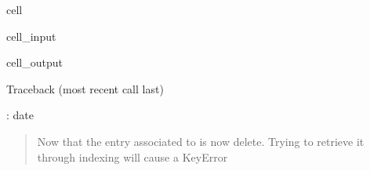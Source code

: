 \documentclass[letterpaper,10pt,english]{jupyterBook}
\begin{document}
\begin{sphinxuseclass}{cell}\begin{sphinxVerbatimInput}

\begin{sphinxuseclass}{cell_input}
\begin{sphinxVerbatim}[commandchars=\\\{\}]
\PYG{p}{[}\PYG{p}{]}
\end{sphinxVerbatim}

\end{sphinxuseclass}\end{sphinxVerbatimInput}
\begin{sphinxVerbatimOutput}

\begin{sphinxuseclass}{cell_output}
\begin{sphinxVerbatim}[commandchars=\\\{\}]
Traceback (most recent call last)
 \PYG{p}{[}\PYG{p}{]}  
 \PYG{p}{[}\PYG{p}{]}

: \PYGZsq{}date\PYGZsq{}
\end{sphinxVerbatim}

\end{sphinxuseclass}\end{sphinxVerbatimOutput}

\end{sphinxuseclass}\begin{quote}

\sphinxAtStartPar
Now that the entry associated to  is now delete. Trying to retrieve it through indexing will cause a KeyError
\end{quote}
\end{document}
